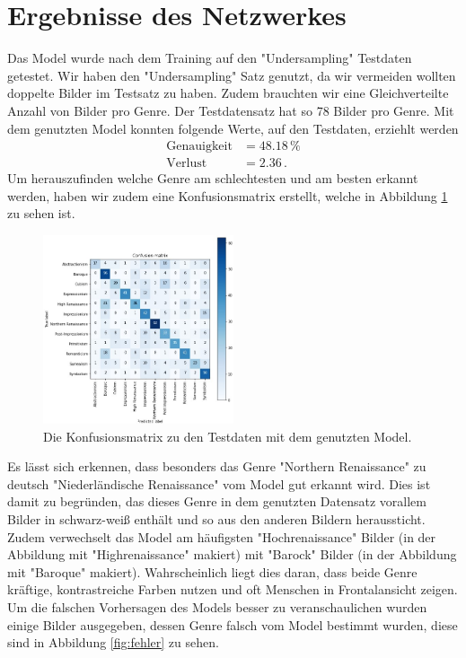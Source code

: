 \section{Ergebnisse des Netzwerkes}
\label{sec:ergebnisse}
Das Model wurde nach dem Training auf den "Undersampling" Testdaten getestet.
Wir haben den "Undersampling" Satz genutzt, da wir vermeiden wollten doppelte Bilder im Testsatz zu haben.
Zudem brauchten wir eine Gleichverteilte Anzahl von Bilder pro Genre.
Der Testdatensatz hat so 78 Bilder pro Genre.
Mit dem genutzten Model konnten folgende Werte, auf den Testdaten, erziehlt werden
\begin{align*}
    \text{Genauigkeit} &= 48.18\, \% \\
    \text{Verlust} &= 2.36 \, .
\end{align*}
Um herauszufinden welche Genre am schlechtesten und am besten erkannt werden, haben wir zudem eine Konfusionsmatrix erstellt, welche in Abbildung \ref{fig:confusion} zu sehen ist.
\begin{figure}
    \centering
    \includegraphics[width=0.5\textwidth]{content/data/confusion.JPG}
    \caption{Die Konfusionsmatrix zu den Testdaten mit dem genutzten Model.}
    \label{fig:confusion}
\end{figure}
Es lässt sich erkennen, dass besonders das Genre "Northern Renaissance" zu deutsch "Niederländische Renaissance" vom Model gut erkannt wird.
Dies ist damit zu begründen, das dieses Genre in dem genutzten Datensatz vorallem Bilder in schwarz-weiß enthält und so aus den anderen Bildern heraussticht.
Zudem verwechselt das Model am häufigsten "Hochrenaissance" Bilder (in der Abbildung mit "Highrenaissance" makiert) mit "Barock" Bilder (in der Abbildung mit "Baroque" makiert).
Wahrscheinlich liegt dies daran, dass beide Genre kräftige, kontrastreiche Farben nutzen und oft Menschen in Frontalansicht zeigen.
Um die falschen Vorhersagen des Models besser zu veranschaulichen wurden einige Bilder ausgegeben, dessen Genre falsch vom Model bestimmt wurden, diese sind in Abbildung \ref{fig:fehler} zu sehen.

